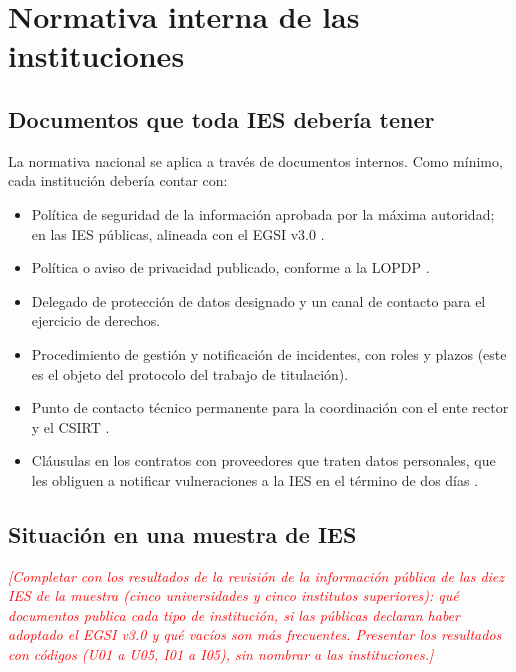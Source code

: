 \documentclass[11pt,a4paper,oneside]{report}
\newcommand{\pendiente}[1]{\textcolor{red}{\textit{[#1]}}}
\newcommand{\casilla}{$\square$}
\begin{document}
\chapter{Normativa interna de las instituciones}
\label{cap:interna}
\section{Documentos que toda IES debería tener}
La normativa nacional se aplica a través de documentos internos. Como mínimo, cada institución debería contar con:

\begin{itemize}[leftmargin=*]
  \item[\casilla] Política de seguridad de la información aprobada por la máxima autoridad; en las IES públicas, alineada con el EGSI v3.0 \cite{egsi2024}.
  \item[\casilla] Política o aviso de privacidad publicado, conforme a la LOPDP \cite{lopdp2021}.
  \item[\casilla] Delegado de protección de datos designado y un canal de contacto para el ejercicio de derechos.
  \item[\casilla] Procedimiento de gestión y notificación de incidentes, con roles y plazos (este es el objeto del protocolo del trabajo de titulación).
  \item[\casilla] Punto de contacto técnico permanente para la coordinación con el ente rector y el CSIRT \cite{lofc2026}.
  \item[\casilla] Cláusulas en los contratos con proveedores que traten datos personales, que les obliguen a notificar vulneraciones a la IES en el término de dos días \cite{lopdp2021}.
\end{itemize}

\section{Situación en una muestra de IES}
\pendiente{Completar con los resultados de la revisión de la información pública de las diez IES de la muestra (cinco universidades y cinco institutos superiores): qué documentos publica cada tipo de institución, si las públicas declaran haber adoptado el EGSI v3.0 y qué vacíos son más frecuentes. Presentar los resultados con códigos (U01 a U05, I01 a I05), sin nombrar a las instituciones.}

\end{document}
